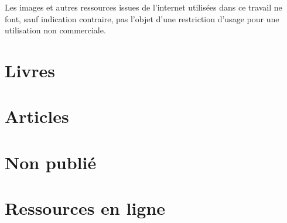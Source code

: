 \documentclass[12pt,fleqn,oneside,openany]{book} %
\begin{document}
\begin{remark}
	Les images et autres ressources issues de l'internet utilisées dans ce travail ne font, sauf indication contraire, pas l'objet d'une restriction d'usage pour une utilisation non commerciale.
\end{remark}

\section*{Livres}
\printbibliography[heading=bibempty,type=book]
\section*{Articles}
\printbibliography[heading=bibempty,type=article]
\section*{Non publié}
\printbibliography[heading=bibempty,type=unpublished]
\section*{Ressources en ligne}
\printbibliography[heading=bibempty,type=online]

\end{document}
